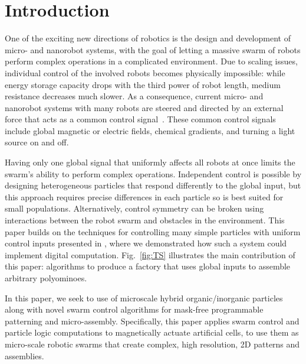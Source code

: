 \section{Introduction}\label{sec:Intro}

One of the exciting new directions of robotics is the design and development
of micro- and nanorobot systems, with the goal of letting a massive swarm of robots
perform complex operations in a complicated environment. Due to scaling 
issues, individual control of the involved robots becomes physically impossible:
while energy storage capacity drops with the third power of robot length,
medium resistance decreases much slower. As a consequence,
current micro- and nanorobot systems with many robots are steered and
directed by an external force that acts as a common control signal~\cite{Donald2013,Chiang2011,Hsi-Wen2012,Diller2013,Jing2013,Ou2013,Lanauze2013}.
These common control signals include global magnetic or electric fields,
chemical gradients, and turning a light source on and off. 

 
Having only one global signal that uniformly affects all robots at once
limits the swarm's ability to perform complex operations.
Independent control is possible by designing heterogeneous particles that respond differently to the global input, but this approach requires precise differences in each particle so is best suited for small populations. Alternatively, control symmetry can be broken using interactions between the robot swarm
and obstacles in the environment. 
This paper builds on the techniques for controlling many simple particles with uniform control inputs presented in \cite{Becker2013f,Becker2014,Becker2014a}, where
we demonstrated how such a system could  implement digital computation.
Fig.~\ref{fig:TS} illustrates the main contribution of this paper: algorithms to produce a factory that uses global inputs to assemble arbitrary polyominoes.


In this paper, we seek to use of microscale hybrid organic/inorganic particles along with novel swarm control algorithms for mask-free programmable patterning and micro-assembly. 
Specifically, this paper applies swarm control and particle logic computations to magnetically actuate artificial cells, to use them as micro-scale robotic swarms that create complex, high resolution, 2D patterns and assemblies.



